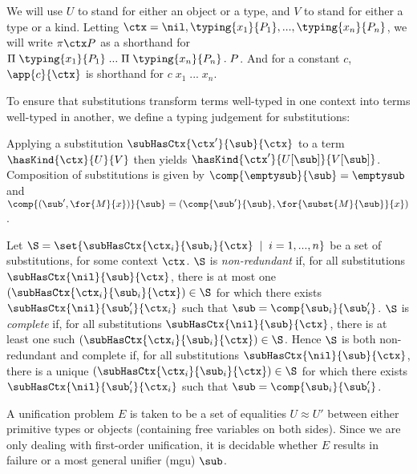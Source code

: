 We will use $U$ to stand for either an object or a type, and $V$ to stand for either a type or a kind.
Letting $\ctx = \nil, \typing{x_1}{P_1}, ..., \typing{x_n}{P_n}$, we will write $\pi{\ctx}{P}$ as a shorthand for $\Pi \; \typing{x_1}{P_1} \; ... \; \Pi \; \typing{x_n}{P_n} \, . \; P$. 
And for a constant $c$, $\app{c}{\ctx}$ is shorthand for $c \; x_1 \; ... \; x_n$.

To ensure that substitutions transform terms well-typed in one context into terms well-typed in another, we define a typing judgement for substitutions:

{ %
\vspace{0.5cm}
\noindent {}

\begin{prooftree}
\end{prooftree}

\begin{prooftree}
\end{prooftree}

\vspace{0.5cm}
}

Applying a substitution $\subHasCtx{\ctx'}{\sub}{\ctx}$ to a term $\hasKind{\ctx}{U}{V}$ then yields $\hasKind{\ctx'}{U[\sub]}{V[\sub]}$.
Composition of substitutions is given by $\comp{\emptysub}{\sub} = \emptysub$ and $\comp{(\sub', \for{M}{x})}{\sub} = (\comp{\sub'}{\sub}, \for{\subst{M}{\sub}}{x})$.

Let $\S = \set{\subHasCtx{\ctx_i}{\sub_i}{\ctx} \;\;|\;\; i = 1, ..., n}$ be a set of substitutions, for some context $\ctx$.
$\S$ is \textit{non-redundant} if, for all substitutions $\subHasCtx{\nil}{\sub}{\ctx}$, there is at most one $(\subHasCtx{\ctx_i}{\sub_i}{\ctx}) \in \S$ for which there exists $\subHasCtx{\nil}{\sub_i'}{\ctx_i}$ such that $\sub = \comp{\sub_i}{\sub_i'}$.
$\S$ is \textit{complete} if, for all substitutions $\subHasCtx{\nil}{\sub}{\ctx}$, there is at least one such $(\subHasCtx{\ctx_i}{\sub_i}{\ctx}) \in \S$.
Hence $\S$ is both non-redundant and complete if, for all substitutions $\subHasCtx{\nil}{\sub}{\ctx}$, there is a unique $(\subHasCtx{\ctx_i}{\sub_i}{\ctx}) \in \S$ for which there exists $\subHasCtx{\nil}{\sub_i'}{\ctx_i}$ such that $\sub = \comp{\sub_i}{\sub_i'}$.

A unification problem $E$ is taken to be a set of equalities $U \approx U'$ between either primitive types or objects (containing free variables on both sides).
Since we are only dealing with first-order unification, it is decidable whether $E$ results in failure or a most general unifier (mgu) $\sub$.
